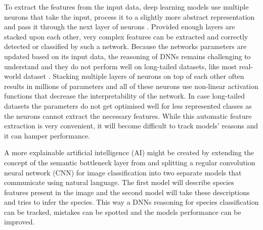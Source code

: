 \documentclass[a4paper, 12pt, oneside]{book} %
\begin{document}
To extract the features from the input data, deep learning models use multiple neurons that take the input, process it to a slightly more abstract representation and pass it through the next layer of neurons \autocite{schmidhuber_deep_2015}.
Provided enough layers are stacked upon each other, very complex features can be extracted and correctly detected or classified by such a network.
Because the networks parameters are updated based on its input data, the reasoning of DNNs remains challenging to understand \autocite{li_interpretable_2021, losch_interpretability_2019} and they do not perform well on long-tailed datasets, like most real-world dataset \autocite{van_horn_inaturalist_2018}.
Stacking multiple layers of neurons on top of each other often results in millions of parameters and all of these neurons use non-linear activation functions that decrease the interpretability of the network.
In case long-tailed datasets the parameters do not get optimised well for less represented classes as the neurons cannot extract the necessary features.
While this automatic feature extraction is very convenient, it will become difficult to track models' reasons and it can hamper performance.

A more explainable artificial intelligence (AI) might be created by extending the concept of the semantic bottleneck layer from \textcite{ishikawa_contextual_2021} and splitting a regular convolution neural network (CNN) for image classification into two separate models that communicate using natural language.
The first model will describe species features present in the image and the second model will take these descriptions and tries to infer the species.
This way a DNNs reasoning for species classification can be tracked, mistakes can be spotted and the models performance can be improved.
\end{document}
